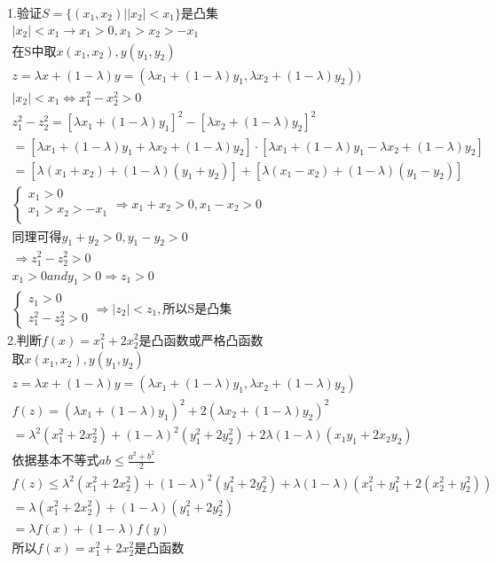 \documentclass{article}
\begin{document}
    1.验证$S=\{(x_1,x_2)||x_2|<x_1\}$是凸集
    \begin{gather*}
        |x_2| < x_1 \rightarrow x_1 > 0, x_1 > x_2 > - x_1\\
        \text{在S中取} x(x_1, x_2),y(y_1, y_2)\\
        z = \lambda x + (1-\lambda)y = (\lambda x_1 + (1-\lambda) y_1, \lambda x_2 + (1-\lambda)y_2))\\
        |x_2| < x_1 \Leftrightarrow x_1^2 - x_2^2 > 0\\
        z_1^2 - z_2^2 = \left[\lambda x_1 + (1-\lambda) y_1\right]^2 - \left[\lambda x_2 + (1-\lambda)y_2\right]^2\\
        =\left[\lambda x_1 + (1-\lambda) y_1 + \lambda x_2 + (1-\lambda)y_2\right] 
        \cdot \left[\lambda x_1 + (1-\lambda) y_1 - \lambda x_2 + (1-\lambda)y_2\right]\\
        = \left[\lambda(x_1 + x_2) + (1-\lambda) (y_1 + y_2)\right]
        + \left[\lambda(x_1 - x_2) + (1-\lambda) (y_1 - y_2)\right]\\
        \begin{cases}
            x_1 > 0\\
            x_1 > x_2 > - x_1\\
        \end{cases}
        \Rightarrow x_1 + x_2 > 0, x_1 - x_2 > 0\\
        \text{同理可得} y_1 + y_2 > 0, y_1 - y_2 > 0\\
        \Rightarrow z_1^2 - z_2^2 > 0 \\
        x_1 > 0 and y_1 > 0 \Rightarrow z_1 > 0 \\
        \begin{cases}
            z_1 > 0\\
            z_1^2 - z_2^2 > 0
        \end{cases}
        \Rightarrow |z_2| < z_1,\text{所以S是凸集}
    \end{gather*}
    2.判断$f(x)=x_1^2 + 2x_2^2$是凸函数或严格凸函数
    \begin{gather*}
        \text{取}x(x_1, x_2),y(y_1, y_2)\\
        z = \lambda x + (1 - \lambda)y = (\lambda x_1 + (1-\lambda) y_1, \lambda x_2 + (1-\lambda)y_2)\\
        f(z) = (\lambda x_1 + (1-\lambda) y_1)^2 + 2 (\lambda x_2 + (1-\lambda)y_2)^2\\
        = \lambda^2 (x_1^2 + 2 x_2^2) + (1 - \lambda)^2(y_1^2 + 2y_2^2) + 2\lambda(1 - \lambda)(x_1y_1 + 2x_2y_2)\\
        \text{依据基本不等式} ab \le \frac{a^2 + b^2}{2}\\
        f(z) \le \lambda^2 (x_1^2 + 2 x_2^2) + (1 - \lambda)^2(y_1^2 + 2y_2^2)
        + \lambda(1 - \lambda)(x_1^2 + y_1^2 + 2 (x_2^2 + y_2^2) )\\
        = \lambda (x_1^2 + 2x_2^2) + (1-\lambda)(y_1^2 + 2 y_2^2)\\
        = \lambda f(x) + (1-\lambda)f(y)\\
        \text{所以$f(x)=x_1^2 + 2x_2^2$是凸函数}
    \end{gather*}
\end{document}
